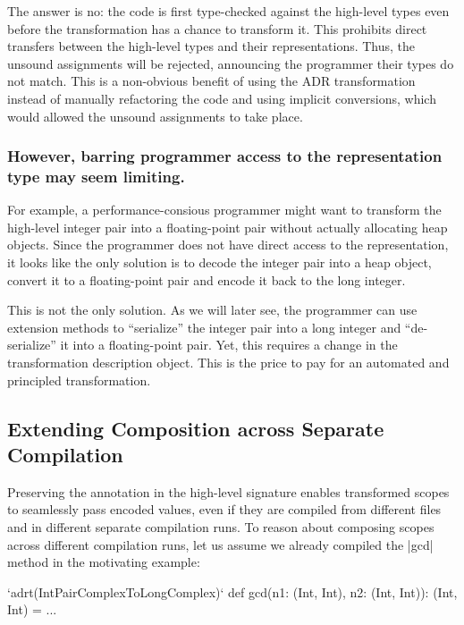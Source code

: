 The answer is no: the code is first type-checked against the high-level types even before the \inject{} transformation has a chance to transform it. This prohibits direct transfers between the high-level types and their representations. Thus, the unsound assignments will be rejected, announcing the programmer their types do not match. This is a non-obvious benefit of using the ADR transformation instead of manually refactoring the code and using implicit conversions, which would allowed the unsound assignments to take place.

\subsubsection{However, barring programmer access to the representation type may seem limiting.} For example, a performance-consious programmer might want to transform the high-level integer pair into a floating-point pair without actually allocating heap objects. Since the programmer does not have direct access to the representation, it looks like the only solution is to decode the integer pair into a heap object, convert it to a floating-point pair and encode it back to the long integer.

This is not the only solution. As we will later see, the programmer can use extension methods to ``serialize'' the integer pair into a long integer and ``de-serialize'' it into a floating-point pair. Yet, this requires a change in the transformation description object. This is the price to pay for an automated and principled transformation.










\subsection{Extending Composition across Separate Compilation}
\label{sec:ildl:sepatate-compilation}

Preserving the annotation in the high-level signature enables transformed scopes to seamlessly pass encoded values, even if they are compiled from different files and in different separate compilation runs. To reason about composing scopes across different compilation runs, let us assume we already compiled the |gcd| method in the motivating example:

\begin{lstlisting-nobreak}
`adrt(IntPairComplexToLongComplex)` {
  def gcd(n1: (Int, Int), n2: (Int, Int)): (Int, Int) = ...
}
\end{lstlisting-nobreak}

